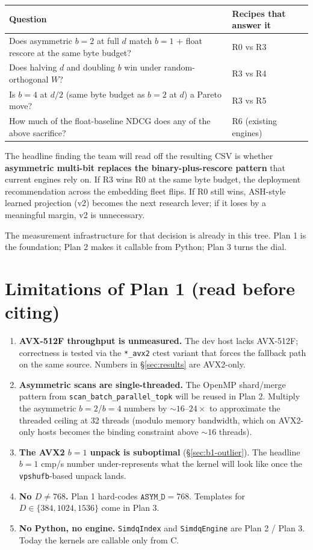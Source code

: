 \documentclass[11pt,a4paper]{article}
\begin{document}
\begin{center}
\begin{tabular}{p{}l}
\toprule
\textbf{Question} & \textbf{Recipes that answer it} \\
\midrule
Does asymmetric $b = 2$ at full $d$ match $b = 1$ + float rescore at the same byte budget? & R0 vs R3 \\
Does halving $d$ and doubling $b$ win under random-orthogonal $W$? & R3 vs R4 \\
Is $b = 4$ at $d/2$ (same byte budget as $b = 2$ at $d$) a Pareto move? & R3 vs R5 \\
How much of the float-baseline NDCG does any of the above sacrifice? & R6 (existing engines) \\
\bottomrule
\end{tabular}
\end{center}

The headline finding the team will read off the resulting CSV is
whether \textbf{asymmetric multi-bit replaces the binary-plus-rescore
pattern} that current engines rely on. If R3 wins R0 at the same byte
budget, the deployment recommendation across the embedding fleet
flips. If R0 still wins, ASH-style learned projection (v2) becomes
the next research lever; if it loses by a meaningful margin, v2 is
unnecessary.

The measurement infrastructure for that decision is already in this
tree. Plan 1 is the foundation; Plan 2 makes it callable from Python;
Plan 3 turns the dial.

\section{Limitations of Plan 1 (read before citing)}

\begin{enumerate}
    \item \textbf{AVX-512F throughput is unmeasured.} The dev host
    lacks AVX-512F; correctness is tested via the \texttt{*\_avx2}
    ctest variant that forces the fallback path on the same source.
    Numbers in \S\ref{sec:results} are AVX2-only.
    \item \textbf{Asymmetric scans are single-threaded.} The OpenMP
    shard/merge pattern from \texttt{scan\_batch\_parallel\_topk} will
    be reused in Plan 2. Multiply the asymmetric $b = 2$/$b = 4$
    numbers by $\sim 16$--$24\times$ to approximate the threaded
    ceiling at 32 threads (modulo memory bandwidth, which on AVX2-only
    hosts becomes the binding constraint above $\sim 16$ threads).
    \item \textbf{The AVX2 $b = 1$ unpack is suboptimal}
    (\S\ref{sec:b1-outlier}). The headline $b = 1$ cmp/s number
    under-represents what the kernel will look like once the
    \texttt{vpshufb}-based unpack lands.
    \item \textbf{No $D \ne 768$.} Plan 1 hard-codes
    $\texttt{ASYM\_D} = 768$. Templates for $D \in \{384, 1024,
    1536\}$ come in Plan 3.
    \item \textbf{No Python, no engine.} \texttt{SimdqIndex} and
    \texttt{SimdqEngine} are Plan 2 / Plan 3. Today the kernels are
    callable only from C.
\end{enumerate}
\end{document}
